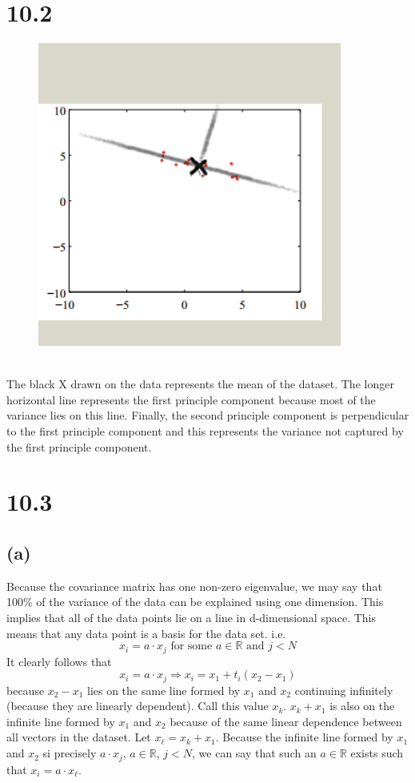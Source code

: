 \documentclass[11pt]{article}
\begin{document}
\section*{10.2}
\begin{figure}[h!]
	\centering
	\includegraphics[width=100mm]{10_2.png}
\end{figure}
\ \\
The black X drawn on the data represents the mean of the dataset. The longer horizontal line represents the first principle component because most of the variance lies on this line. Finally, the second principle component is perpendicular to the first principle component and this represents the variance not captured by the first principle component.
\clearpage
\section*{10.3}
\subsection*{(a)}
Because the covariance matrix has one non-zero eigenvalue, we may say that 100\% of the variance of the data can be explained using one dimension. This implies that all of the data points lie on a line in d-dimensional space. This means that any data point is a basis for the data set. i.e.
\[x_i=a\cdot x_j\text{ for some }a\in\mathbb{R}\text{ and }j<N\]
It clearly follows that
\[x_i=a\cdot x_j\Rightarrow x_i = x_1 + t_i(x_2-x_1)\]
because $x_2-x_1$ lies on the same line formed by $x_1$ and $x_2$ continuing infinitely (because they are linearly dependent). Call this value $x_k$. $x_k+x_1$ is also on the infinite line formed by $x_1$ and $x_2$ because of the same linear dependence between all vectors in the dataset. Let $x_\ell=x_k+x_1$. Because the infinite line formed by $x_1$ and $x_2$ si precisely $a\cdot x_j$, $a\in\mathbb{R}$, $j<N$, we can say that such an $a\in\mathbb{R}$ exists such that $x_i=a\cdot x_\ell$.
\end{document}
